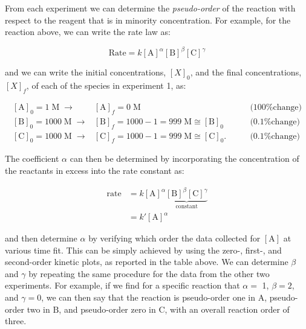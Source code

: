 \documentclass[
  9pt,
]{extbook}
\theoremstyle{definition}
\theoremstyle{definition}
\theoremstyle{definition}
\theoremstyle{remark}
\begin{document}
From each experiment we can determine the \emph{pseudo-order} of the reaction with respect to the reagent that is in minority concentration. For example, for the reaction above, we can write the rate law as:

\begin{equation}
\text{Rate}=k[\mathrm{A}]^{\alpha}[\mathrm{B}]^{\beta}[\mathrm{C}]^{\gamma}
\label{eq:kiniso1}
\end{equation}

and we can write the initial concentrations, \([X]_0\), and the final concentrations, \([X]_f\), of each of the species in experiment 1, as:

\begin{equation}
\begin{aligned}
\left[\mathrm{A}\right]_0 =1\;\text{M}\;\longrightarrow &[\mathrm{A}]_f=0\;\text{M} \qquad &\text{(100\% change)} \\
\left[\mathrm{B}\right]_0 =1000\;\text{M}\;\longrightarrow &[\mathrm{B}]_f=1000-1=999\;\text{M}\cong [\mathrm{B}]_0\qquad &\text{(0.1\% change)}\\
\left[\mathrm{C}\right]_0 =1000\;\text{M}\;\longrightarrow &[\mathrm{C}]_f=1000-1=999\;\text{M} \cong \left[\mathrm{C}\right]_0. \qquad &\text{(0.1\% change)}
\end{aligned}
\end{equation}

The coefficient \(\alpha\) can then be determined by incorporating the concentration of the reactants in excess into the rate constant as:

\begin{equation}
\begin{aligned}
\text{rate}&=k[\mathrm{A}]^{\alpha}\underbrace{[\mathrm{B}]^{\beta}[\mathrm{C}]^{\gamma}}_{\text{constant}} \\
&= k'[\mathrm{A}]^{\alpha}
\end{aligned}
\end{equation}

and then determine \(\alpha\) by verifying which order the data collected for \([\mathrm{A}]\) at various time fit. This can be simply achieved by using the zero-, first-, and second-order kinetic plots, as reported in the table above. We can determine \(\beta\) and \(\gamma\) by repeating the same procedure for the data from the other two experiments. For example, if we find for a specific reaction that \(\alpha=\) 1, \(\beta=2\), and \(\gamma=0\), we can then say that the reaction is pseudo-order one in \(\mathrm{A}\), pseudo-order two in \(\mathrm{B}\), and pseudo-order zero in \(\mathrm{C}\), with an overall reaction order of three.
\end{document}
